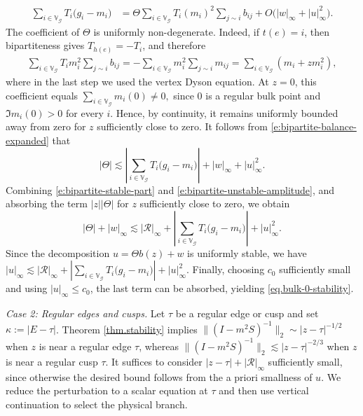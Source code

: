 \documentclass[11pt,twoside, a4paper]{article}
\numberwithin{equation}{section}
\numberwithin{figure}{section}
\theoremstyle{plain} %
\theoremstyle{definition}
\theoremstyle{remark}
\newcommand{\1} {\mspace{1 mu}}
\newcommand{\2} {\mspace{2 mu}}
\begin{document}
\begin{align}
\sum_{i\in\mathbb V_{\mathcal G}}
T_i\bigl(g_i-m_i\bigr)
&=
\Theta
\sum_{i\in\mathbb V_{\mathcal G}}
T_i(m_i)^2
\sum_{j\sim i}b_{ij}
+
O\bigl(|w|_\infty+|u|_\infty^2\bigr).
\label{e:bipartite-balance-expanded}
\end{align}
The coefficient of $\Theta$ is uniformly non-degenerate.
Indeed, if $t(e)=i$, then bipartiteness gives
$T_{h(e)}=-T_i$, and therefore
\[
\begin{aligned}
\sum_{i\in\mathbb V_{\mathcal G}}
T_i m_i^2
\sum_{j\sim i}b_{ij}
=
-\sum_{i\in\mathbb V_{\mathcal G}}
m_i^2
\sum_{j\sim i}m_{ij}
=
\sum_{i\in\mathbb V_{\mathcal G}}
\left(
m_i
+
zm_i^2
\right),
\end{aligned}
\]
where in the last step we used the vertex Dyson equation.
At $z=0$, this coefficient equals
$
\sum_{i\in\mathbb V_{\mathcal G}}m_i(0)\neq0,
$
since $0$ is a regular bulk point and
$\Im m_i(0)>0$ for every $i$.
Hence, by continuity, it remains uniformly bounded away from zero
for $z$ sufficiently close to zero. It follows from
\eqref{e:bipartite-balance-expanded} that
\begin{equation}
\label{e:bipartite-unstable-amplitude}
|\Theta|
\lesssim
\left|
\sum_{i\in\mathbb V_{\mathcal G}}
T_i\bigl(g_i-m_i\bigr)
\right|
+
|w|_\infty
+
|u|_\infty^2.
\end{equation}
Combining \eqref{e:bipartite-stable-part} and
\eqref{e:bipartite-unstable-amplitude}, and absorbing the term
$|z||\Theta|$ for $z$ sufficiently close to zero, we obtain
\[
|\Theta|+|w|_\infty
\lesssim
|\mathcal R|_\infty
+
\left|
\sum_{i\in\mathbb V_{\mathcal G}}
T_i\bigl(g_i-m_i\bigr)
\right|
+
|u|_\infty^2.
\]
Since the decomposition $u=\Theta b(z)+w$ is uniformly stable, we have
$
|u|_\infty
\lesssim
|\mathcal R|_\infty
+
|
\sum_{i\in\mathbb V_{\mathcal G}}
T_i\bigl(g_i-m_i\bigr)
|
+
|u|_\infty^2.
$
Finally, choosing $c_0$ sufficiently small and using
$|u|_\infty\le c_0$, the last term can be absorbed, yielding
\eqref{eq.bulk-0-stability}.

\medskip\noindent\emph{Case 2: Regular edges and cusps.}
Let $\tau$ be a regular edge or cusp and set $\kappa:=|E-\tau|$.
Theorem \ref{thm.stability} implies
$
\bigl\|(I-m^2S)^{-1}\bigr\|_2
\sim |z-\tau|^{-1/2}
$
when $z$ is near a regular edge $\tau$, whereas
$
\bigl\|(I-m^2S)^{-1}\bigr\|_2
\lesssim |z-\tau|^{-2/3}
$
when $z$ is near a regular cusp $\tau$.
It suffices to consider $|z-\tau|+|\mathcal R|_\infty$ sufficiently small,
since otherwise the desired bound follows from the a priori smallness
of $u$.
We reduce the perturbation to a scalar equation at $\tau$ and
then use vertical continuation to select the physical branch.
\end{document}
